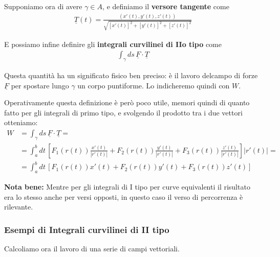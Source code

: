 Supponiamo ora di avere $\gamma\in A$, e definiamo il \textbf{versore tangente} come
\begin{align}
\underline{T}(t)=\frac{(x'(t),y'(t),z'(t))}{\sqrt{[x'(t)]^2 + [y'(t)]^2 + [z'(t)]^2}}
\end{align}

E possiamo infine definire gli \textbf{integrali curvilinei di IIo tipo} come
\begin{align}
\int_{\gamma}ds \, \underline{F}\cdot \underline{T}
\end{align}

Questa quantità ha un significato fisico ben preciso: è il lavoro delcampo di forze $\underline{F}$ per spostare lungo $\gamma$ un corpo puntiforme. Lo indicheremo quindi con $W$.

Operativamente questa definizione è però poco utile, memori quindi di quanto fatto per gli integrali di primo tipo, e svolgendo il prodotto tra i due vettori otteniamo:
\begin{align}
W{}&=\int_{\gamma}ds \, \underline{F}\cdot \underline{T} = \nonumber \\
&= \int_{a}^{b}dt \, \left[F_1(r(t)) \frac{x'(t)}{|r'(t)|} + F_2(r(t)) \frac{y'(t)}{|r'(t)|} + F_3(r(t)) \frac{z'(t)}{|r'(t)|}
\right] |r'(t)|= \nonumber \\
&= \int_{a}^{b}dt \, \left[F_1(r(t)) x'(t) + F_2(r(t)) y'(t) + F_3(r(t)) z'(t)
\right]
\end{align}

\textbf{Nota bene:} Mentre per gli integrali di I tipo per curve equivalenti il risultato era lo stesso anche per versi opposti, in questo caso il verso di percorrenza è rilevante.

\subsubsection{Esempi di Integrali curvilinei di II tipo}

Calcoliamo ora il lavoro di una serie di campi vettoriali.

